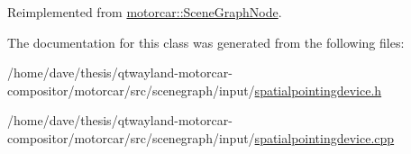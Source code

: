 Reimplemented from \hyperlink{classmotorcar_1_1SceneGraphNode_aa680a8e89fc8ebd12b784653fb30c29a}{motorcar\-::\-Scene\-Graph\-Node}.



The documentation for this class was generated from the following files\-:\begin{DoxyCompactItemize}
\item 
/home/dave/thesis/qtwayland-\/motorcar-\/compositor/motorcar/src/scenegraph/input/\hyperlink{spatialpointingdevice_8h}{spatialpointingdevice.\-h}\item 
/home/dave/thesis/qtwayland-\/motorcar-\/compositor/motorcar/src/scenegraph/input/\hyperlink{spatialpointingdevice_8cpp}{spatialpointingdevice.\-cpp}\end{DoxyCompactItemize}

